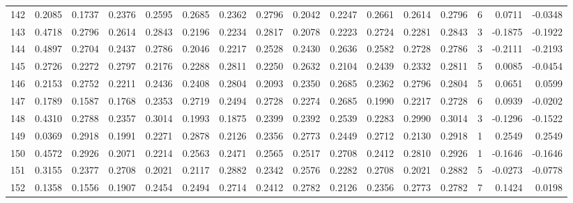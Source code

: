 \begin{tabular}{lrrrrrrrrrrrrrrr}
142 &      0.2085 &  0.1737 &  0.2376 &  0.2595 &  0.2685 &  0.2362 &  0.2796 &  0.2042 &  0.2247 &  0.2661 &   0.2614 &     0.2796 &      6 &                    0.0711 &                    -0.0348 \\
143 &      0.4718 &  0.2796 &  0.2614 &  0.2843 &  0.2196 &  0.2234 &  0.2817 &  0.2078 &  0.2223 &  0.2724 &   0.2281 &     0.2843 &      3 &                   -0.1875 &                    -0.1922 \\
144 &      0.4897 &  0.2704 &  0.2437 &  0.2786 &  0.2046 &  0.2217 &  0.2528 &  0.2430 &  0.2636 &  0.2582 &   0.2728 &     0.2786 &      3 &                   -0.2111 &                    -0.2193 \\
145 &      0.2726 &  0.2272 &  0.2797 &  0.2176 &  0.2288 &  0.2811 &  0.2250 &  0.2632 &  0.2104 &  0.2439 &   0.2332 &     0.2811 &      5 &                    0.0085 &                    -0.0454 \\
146 &      0.2153 &  0.2752 &  0.2211 &  0.2436 &  0.2408 &  0.2804 &  0.2093 &  0.2350 &  0.2685 &  0.2362 &   0.2796 &     0.2804 &      5 &                    0.0651 &                     0.0599 \\
147 &      0.1789 &  0.1587 &  0.1768 &  0.2353 &  0.2719 &  0.2494 &  0.2728 &  0.2274 &  0.2685 &  0.1990 &   0.2217 &     0.2728 &      6 &                    0.0939 &                    -0.0202 \\
148 &      0.4310 &  0.2788 &  0.2357 &  0.3014 &  0.1993 &  0.1875 &  0.2399 &  0.2392 &  0.2539 &  0.2283 &   0.2990 &     0.3014 &      3 &                   -0.1296 &                    -0.1522 \\
149 &      0.0369 &  0.2918 &  0.1991 &  0.2271 &  0.2878 &  0.2126 &  0.2356 &  0.2773 &  0.2449 &  0.2712 &   0.2130 &     0.2918 &      1 &                    0.2549 &                     0.2549 \\
150 &      0.4572 &  0.2926 &  0.2071 &  0.2214 &  0.2563 &  0.2471 &  0.2565 &  0.2517 &  0.2708 &  0.2412 &   0.2810 &     0.2926 &      1 &                   -0.1646 &                    -0.1646 \\
151 &      0.3155 &  0.2377 &  0.2708 &  0.2021 &  0.2117 &  0.2882 &  0.2342 &  0.2576 &  0.2282 &  0.2708 &   0.2021 &     0.2882 &      5 &                   -0.0273 &                    -0.0778 \\
152 &      0.1358 &  0.1556 &  0.1907 &  0.2454 &  0.2494 &  0.2714 &  0.2412 &  0.2782 &  0.2126 &  0.2356 &   0.2773 &     0.2782 &      7 &                    0.1424 &                     0.0198 \\

\end{tabular}
